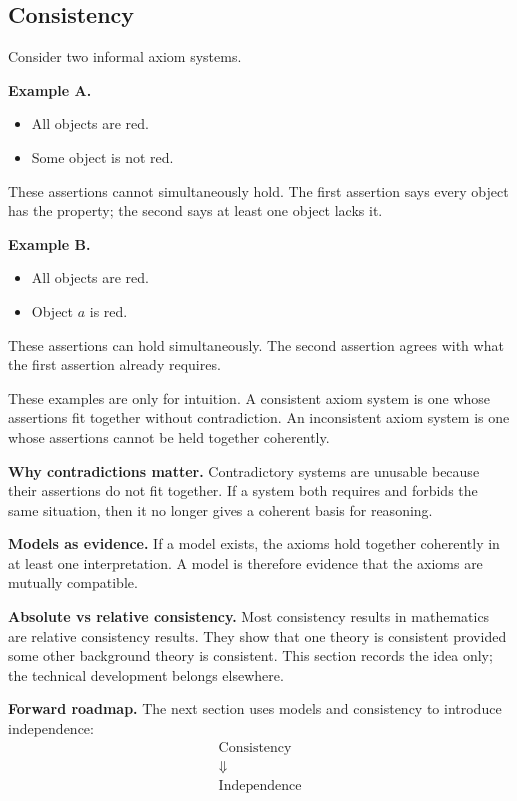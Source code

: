 \subsection*{Consistency}
\label{sec:axiom-systems-consistency}

\begin{tcolorbox}[colback=gray!6, colframe=gray!40, arc=2pt,
  left=8pt, right=8pt, top=6pt, bottom=6pt,
  title={\small\textbf{Consistency Presentation: A Simple Example}},
  fonttitle=\small\bfseries]
Consider two informal axiom systems.

\medskip
\noindent\textbf{Example A.}
\begin{itemize}
  \item All objects are red.
  \item Some object is not red.
\end{itemize}
These assertions cannot simultaneously hold. The first assertion says every
object has the property; the second says at least one object lacks it.

\medskip
\noindent\textbf{Example B.}
\begin{itemize}
  \item All objects are red.
  \item Object $a$ is red.
\end{itemize}
These assertions can hold simultaneously. The second assertion agrees with
what the first assertion already requires.

\medskip
These examples are only for intuition. A consistent axiom system is one whose
assertions fit together without contradiction. An inconsistent axiom system is
one whose assertions cannot be held together coherently.
\end{tcolorbox}

\begin{remark*}
\textbf{Why contradictions matter.}
Contradictory systems are unusable because their assertions do not fit
together. If a system both requires and forbids the same situation, then it no
longer gives a coherent basis for reasoning.

\textbf{Models as evidence.}
If a model exists, the axioms hold together coherently in at least one
interpretation. A model is therefore evidence that the axioms are mutually
compatible.

\textbf{Absolute vs relative consistency.}
Most consistency results in mathematics are relative consistency results. They
show that one theory is consistent provided some other background theory is
consistent. This section records the idea only; the technical development
belongs elsewhere.

\textbf{Forward roadmap.}
The next section uses models and consistency to introduce independence:
\[
\begin{array}{c}
\text{Consistency}\\
\Downarrow\\
\text{Independence}
\end{array}
\]
\end{remark*}

